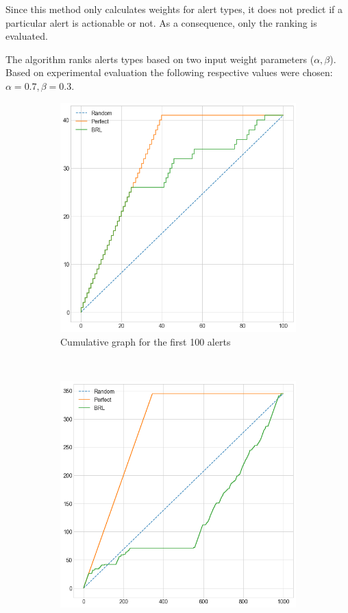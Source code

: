 Since this method only calculates weights for alert types, it does not predict if a particular alert is actionable or not. As a consequence, only the ranking is evaluated.

The algorithm ranks alerts types based on two input weight parameters ($\alpha,\beta$). Based on experimental evaluation the following respective values were chosen: $\alpha=0.7, 
\beta=0.3$.

\begin{figure}[H]
	\begin{subfigure}{\textwidth}
		\centering
		\includegraphics[scale=0.3]{./src/brls/brls_cumulative_graph_top100.png}
		\caption{Cumulative graph for the first 100 alerts}\label{}
	\end{subfigure}\\
	\begin{subfigure}{.5\textwidth}
		\centering
		\includegraphics[scale=0.3]{./src/brls/brls_cumulative_graph_top1000.png}

\end{subfigure}
\end{figure}
